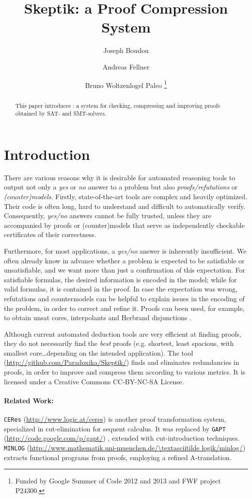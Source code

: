 \documentclass{llncs}
\title{ 
Skeptik: a Proof Compression System
}
\author{
  Joseph Boudou\inst{1}
  \and 
  Andreas Fellner\inst{2,3}
  \and 
  Bruno Woltzenlogel Paleo\inst{3}
  \thanks{Funded by Google Summer of Code 2012 and 2013 and FWF project P24300.}
}
\institute{
  IRIT, Universit\'e de Toulouse, France \\
  \email{joseph.boudou@irit.fr}
  \and 
  Free University of Bolzano, Italy \\
  \email{fellner.a@gmail.com}
  \and 
  Vienna University of Technology, Austria \\
  \email{bruno@logic.at}
}
\begin{document}
\maketitle


\begin{abstract}
This paper introduces \skeptik: a system for checking, compressing and improving proofs obtained by SAT- and SMT-solvers.
\end{abstract}

\setcounter{footnote}{0}


\section{Introduction}

There are various reasons why it is desirable 
for automated reasoning
tools to output not only a \emph{yes} or \emph{no} answer to a problem 
but also \emph{proofs/refutations} or \emph{(counter)models}. 
%
Firstly, state-of-the-art tools are complex and heavily optimized. Their code is often long, hard to understand and difficult to automatically verify. Consequently, \emph{yes/no} answers cannot be fully trusted, unless they are accompanied by proofs or (counter)models that serve as independently checkable certificates of 
their correctness. 

Furthermore, for most applications, a \emph{yes/no} answer is inherently insufficient. We often already know in advance whether a problem is expected to be satisfiable or unsatisfiable, and we want more than just a confirmation of this expectation. For satisfiable formulas, the desired information is encoded in the model; while for valid formulas, it is contained in the proof. In case the expectation was wrong, refutations and countermodels can be helpful to explain issues in the encoding of the problem, in order to correct and refine it. Proofs can been used, for example, to obtain unsat cores, interpolants and Herbrand disjunctions \cite{Paleo2008Herbrand}.

Although current automated deduction tools are very efficient at finding proofs, they do not necessarily find the \emph{best} proofs (e.g. shortest, least spacious, with smallest core\ldots depending on the intended application). The {\skeptik} tool (\url{http://github.com/Paradoxika/Skeptik/}) finds and eliminates redundancies in proofs, in order to improve and compress them according to various metrics. It is licensed under a Creative Commons CC-BY-NC-SA License.


\paragraph{Related Work:} \texttt{CERes} (\url{http://www.logic.at/ceres})
\cite{CERes} 
is another proof transformation system, specialized in cut-elimination for sequent calculus. It was replaced by \texttt{GAPT} (\url{http://code.google.com/p/gapt/}) \cite{GAPT}, 
extended with cut-introduction techniques.
\texttt{MINLOG} (\url{http://www.mathematik.uni-muenchen.de/\textasciitilde logik/minlog/}) 
extracts functional programs from proofs, employing a refined A-translation.
\end{document}
